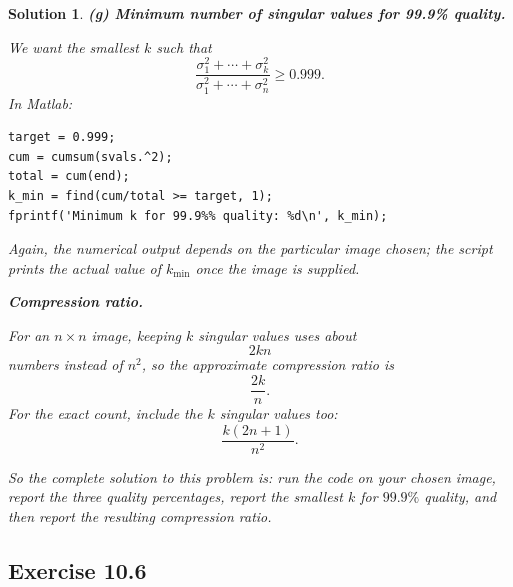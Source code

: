 \documentclass[11pt,a4paper]{article}
\theoremstyle{sol}
\newtheorem*{solution}{Solution}
\begin{document}
\begin{solution}
\textbf{(g) Minimum number of singular values for 99.9\% quality.}

We want the smallest $k$ such that
\[
\frac{\sigma_1^2+\cdots+\sigma_k^2}{\sigma_1^2+\cdots+\sigma_n^2}\ge 0.999.
\]
In Matlab:
\begin{lstlisting}
target = 0.999;
cum = cumsum(svals.^2);
total = cum(end);
k_min = find(cum/total >= target, 1);
fprintf('Minimum k for 99.9%% quality: %d\n', k_min);
\end{lstlisting}

Again, the numerical output depends on the particular image chosen; the script prints the actual value of $k_{\min}$ once the image is supplied.

\textbf{Compression ratio.}

For an $n\times n$ image, keeping $k$ singular values uses about
\[
2kn
\]
numbers instead of $n^2$, so the approximate compression ratio is
\[
\boxed{\frac{2k}{n}.}
\]
For the exact count, include the $k$ singular values too:
\[
\boxed{\frac{k(2n+1)}{n^2}.}
\]

So the complete solution to this problem is: run the code on your chosen image, report the three quality percentages, report the smallest $k$ for $99.9\%$ quality, and then report the resulting compression ratio.
\end{solution}

\clearpage
\subsection*{Exercise 10.6}
\end{document}
